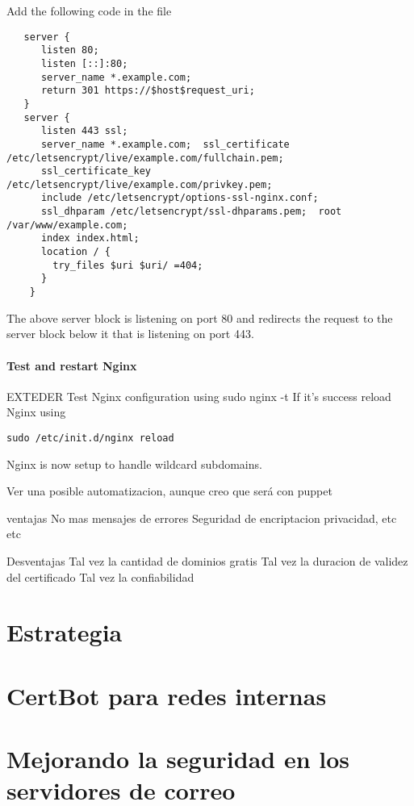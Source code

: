 Add the following code in the file

\begin{verbatim}
   server {
      listen 80;
      listen [::]:80;
      server_name *.example.com;
      return 301 https://$host$request_uri;
   }
   server {
      listen 443 ssl;
      server_name *.example.com;  ssl_certificate /etc/letsencrypt/live/example.com/fullchain.pem;
      ssl_certificate_key /etc/letsencrypt/live/example.com/privkey.pem;
      include /etc/letsencrypt/options-ssl-nginx.conf;
      ssl_dhparam /etc/letsencrypt/ssl-dhparams.pem;  root /var/www/example.com;
      index index.html;
      location / {
        try_files $uri $uri/ =404;
      }
    } 
\end{verbatim}

The above server block is listening on port 80 and redirects the request to the server block below 
it that is listening on port 443.

\paragraph{Test and restart Nginx}
EXTEDER
Test Nginx configuration using 
sudo nginx -t
If it’s success reload Nginx using 
\begin{verbatim}
sudo /etc/init.d/nginx reload
\end{verbatim}
Nginx is now setup to handle wildcard subdomains.

Ver una posible automatizacion, aunque creo que será con puppet

ventajas
No mas mensajes de errores
Seguridad de encriptacion 
privacidad, etc etc

Desventajas
Tal vez la cantidad de dominios gratis
Tal vez la duracion de validez del certificado
Tal vez la confiabilidad




\section{Estrategia}
\section{CertBot para redes internas}
\section{Mejorando la seguridad en los servidores de correo}

